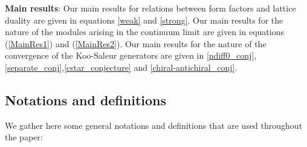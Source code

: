\documentclass[a4paper,10pt]{article}
\begin{document}
\smallskip

\textbf{Main results}: Our main results for relations between form factors and lattice duality are given in equations \eqref{weak} and \eqref{strong}. Our main results for the nature of the modules arising in the continuum limit are given in equations (\ref{MainRes1}) and (\ref{MainRes2}). Our main results for the nature of the convergence of the Koo-Saleur generators are given in \eqref{ndiff0_conj}, \eqref{separate_conj},\eqref{cstar_conjecture} and \eqref{chiral-antichiral_conj}.



\subsection*{Notations and definitions}

We gather here some general notations and definitions that are used throughout the paper:
\end{document}
